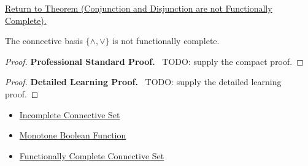 \newpage
{}
\label{prf:conjunction-disjunction-not-functionally-complete-propositional-logic}

\begin{remark*}[Return]
\hyperref[thm:conjunction-disjunction-not-functionally-complete-propositional-logic]{Return to Theorem (Conjunction and Disjunction are not Functionally Complete).}
\end{remark*}

\begin{theorem*}
The connective basis \(\{\land,\lor\}\) is not functionally complete.
\end{theorem*}

\begin{proof}
\textbf{Professional Standard Proof.}~
TODO: supply the compact proof.
\end{proof}

\begin{proof}
\textbf{Detailed Learning Proof.}~
TODO: supply the detailed learning proof.
\end{proof}

\begin{remark*}
\end{remark*}

\begin{dependencies}
\begin{itemize}
  \item \hyperref[def:incomplete-connective-set-propositional-logic]{Incomplete Connective Set}
  \item \hyperref[def:monotone-boolean-function-propositional-logic]{Monotone Boolean Function}
  \item \hyperref[def:functionally-complete-connective-set-propositional-logic]{Functionally Complete Connective Set}
\end{itemize}
\end{dependencies}

\clearpage
